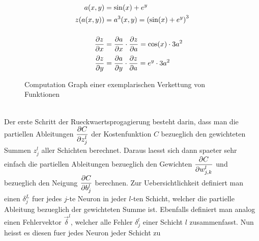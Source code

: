\begin{figure}[h!]
  \begin{minipage}[h!]{0.5\textwidth}
    \centering

  \end{minipage}
  \begin{minipage}[h!]{0.5\textwidth}
    \begin{align*} %
      a(x,y) &= \sin(x) + e^y \\
      z(a(x,y)) &= a^3(x,y) = \left(\sin(x) + e^y\right)^3 \\[3ex]
      \partderiv{z}{x} &= \partderiv{a}{x} \cdot  \partderiv{z}{a} = \cos(x) \cdot 3a^2 \\[0.5ex]
      \partderiv{z}{y} &= \partderiv{a}{y} \cdot \partderiv{z}{a} = e^y \cdot 3a^2
    \end{align*}
  \end{minipage}

  \caption{Computation Graph einer exemplarischen Verkettung von Funktionen}
  \label{fig:computation_graph}
\end{figure}
\\
Der erste Schritt der Rueckwaertsprogagierung besteht darin, dass man die partiellen Ableitungen $\displaystyle\frac{\partial C}{\partial z_j^l}$
der Kostenfunktion $C$ bezueglich den gewichteten Summen $z_j^l$ aller Schichten
berechnet. Daraus laesst sich dann spaeter sehr einfach die partiellen Ableitungen
bezueglich den Gewichten $\displaystyle\frac{\partial C}{\partial w_{j,k}^l}$ und bezueglich den Neigung
$\displaystyle\frac{\partial C}{\partial b_j^l}$ berechnen.
\para{}
Zur Uebersichtlichkeit definiert man einen  $\delta_j^L$ fuer
jedes $j$-te Neuron in jeder $l$-ten Schicht, welcher die partielle Ableitung bezueglich der
gewichteten Summe ist. Ebenfalls definiert man analog einen Fehlervektor
$\vec{\delta}^l$, welcher alle Fehler $\delta_j^l$ einer Schicht $l$
zusammenfasst. Nun heisst es diesen fuer jedes Neuron jeder Schicht zu
